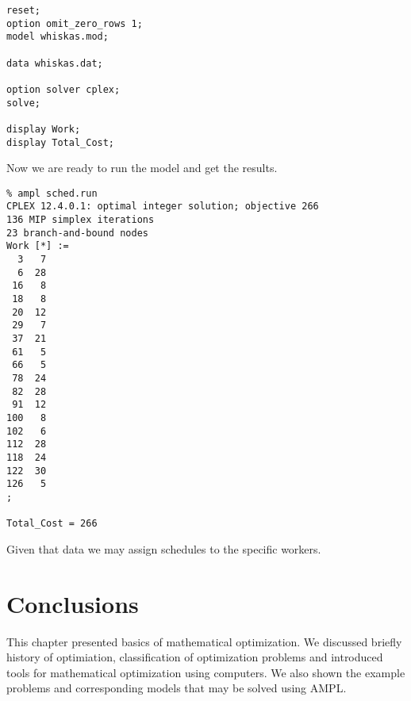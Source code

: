 \begin{lstlisting}
reset;
option omit_zero_rows 1;
model whiskas.mod;

data whiskas.dat;

option solver cplex;
solve;

display Work;
display Total_Cost;
\end{lstlisting}

Now we are ready to run the model and get the results.

\begin{lstlisting}
% ampl sched.run
CPLEX 12.4.0.1: optimal integer solution; objective 266
136 MIP simplex iterations
23 branch-and-bound nodes
Work [*] :=
  3   7
  6  28
 16   8
 18   8
 20  12
 29   7
 37  21
 61   5
 66   5
 78  24
 82  28
 91  12
100   8
102   6
112  28
118  24
122  30
126   5
;

Total_Cost = 266
\end{lstlisting}

Given that data we may assign schedules to the specific workers.

\section{Conclusions}

This chapter presented basics of mathematical optimization. We discussed briefly history of optimiation, classification of optimization problems and introduced tools for mathematical optimization using computers. We also shown the example problems and corresponding models that may be solved using AMPL.
